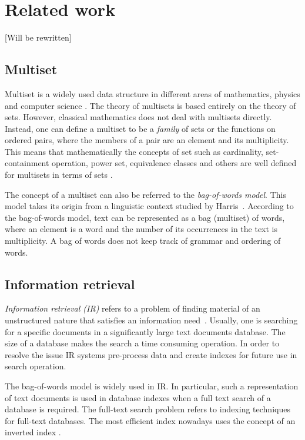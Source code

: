 \section{Related work} \label{c:relwork}
[Will be rewritten]
%
\subsection{Multiset}
Multiset is a widely used data structure in different areas of mathematics, physics 
and computer science \cite{singh2007overview}. The theory of multisets is based 
entirely on the theory of sets. However, classical mathematics does not deal with 
multisets directly. Instead, one can define a multiset to be a \emph{family} of sets 
or the functions on ordered pairs, where the members of a pair are an element and its 
multiplicity. This means that mathematically the concepts of set such as cardinality, 
set-containment operation, power set, equivalence classes and others are well defined 
for multisets in terms of sets \cite{blizard1988multiset}. 

The concept of a multiset can also be referred to the \emph{bag-of-words model}. 
This model takes its origin from a linguistic context studied by Harris~\cite{harris1954distributional}. 
According to the bag-of-words model, text can be represented as a bag (multiset) 
of words, where an element is a word and the number of its occurrences in the 
text is multiplicity. A bag of words does not keep track of grammar and ordering 
of words. 

\subsection{Information retrieval}
\emph{Information retrieval (IR)} refers to a problem of finding material of an 
unstructured nature that satisfies an information need~\cite{manning2008introduction}. 
Usually, one is searching for a specific documents in a significantly large text 
documents database. The size of a database makes the search a time consuming 
operation. In order to resolve the issue IR systems pre-process data and create 
indexes for future use in search operation. 

The bag-of-words model is widely used in IR. In particular, such a representation of 
text documents is used in database indexes when a full text search of a database 
is required. The full-text search problem refers to indexing techniques for full-text 
databases. The most efficient index nowadays uses the concept of an inverted index 
\cite{zobel1992efficient}. 

